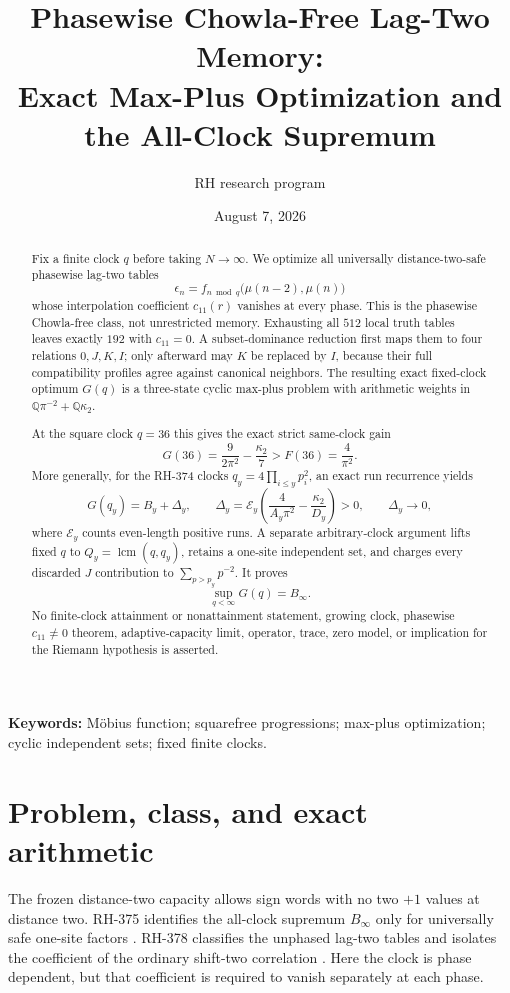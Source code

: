 \documentclass[11pt]{article}
\title{Phasewise Chowla-Free Lag-Two Memory:\\
Exact Max-Plus Optimization and the All-Clock Supremum}
\author{RH research program}
\date{August 7, 2026}
\theoremstyle{definition}
\theoremstyle{remark}
\newcommand{\mob}{\mu}
\newcommand{\kap}{\kappa_2}
\newcommand{\Ecal}{\mathcal E}
\begin{document}
\maketitle

\begin{abstract}
Fix a finite clock $q$ before taking $N\to\infty$.  We optimize all
universally distance-two-safe phasewise lag-two tables
\[
 \epsilon_n=f_{n\bmod q}\bigl(\mob(n-2),\mob(n)\bigr)
\]
whose interpolation coefficient $c_{11}(r)$ vanishes at every phase.  This
is the phasewise Chowla-free class, not unrestricted memory.  Exhausting all
$512$ local truth tables leaves exactly $192$ with $c_{11}=0$.  A
subset-dominance reduction first maps them to four relations $0,J,K,I$;
only afterward may $K$ be replaced by $I$, because their full compatibility
profiles agree against canonical neighbors.  The resulting exact
fixed-clock optimum $G(q)$ is a three-state cyclic max-plus problem with
arithmetic weights in $\mathbb Q\pi^{-2}+\mathbb Q\kap$.

At the square clock $q=36$ this gives the exact strict same-clock gain
\[
 G(36)=\frac{9}{2\pi^2}-\frac{\kap}{7}
 >F(36)=\frac4{\pi^2}.
\]
More generally, for the RH-374 clocks $q_y=4\prod_{i\le y}p_i^2$, an exact
run recurrence yields
\[
 G(q_y)=B_y+\Delta_y,
 \qquad
 \Delta_y=\Ecal_y\left(\frac4{A_y\pi^2}-\frac{\kap}{D_y}\right)>0,
 \qquad \Delta_y\to0,
\]
where $\Ecal_y$ counts even-length positive runs.  A separate arbitrary-clock
argument lifts fixed $q$ to $Q_y=\operatorname{lcm}(q,q_y)$, retains a
one-site independent set, and charges every discarded $J$ contribution to
$\sum_{p>p_y}p^{-2}$.  It proves
\[
                    \sup_{q<\infty}G(q)=B_\infty.
\]
No finite-clock attainment or nonattainment statement, growing clock,
phasewise $c_{11}\ne0$ theorem, adaptive-capacity limit, operator, trace,
zero model, or implication for the Riemann hypothesis is asserted.
\end{abstract}

\noindent\textbf{Keywords:} M\"obius function; squarefree progressions;
max-plus optimization; cyclic independent sets; fixed finite clocks.

\section{Problem, class, and exact arithmetic}

The frozen distance-two capacity allows sign words with no two $+1$ values
at distance two.  RH-375 identifies the all-clock supremum $B_\infty$ only
for universally safe one-site factors \cite{RH375}.  RH-378 classifies the
unphased lag-two tables and isolates the coefficient of the ordinary
shift-two correlation \cite{RH378}.  Here the clock is phase dependent, but
that coefficient is required to vanish separately at each phase.
\end{document}
